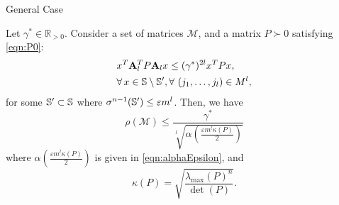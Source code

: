 \begin{subsection}{General Case}
\begin{thm}\label{thm:mainTheorem01}
Let $\gamma^* \in \mathbb{R}_{> 0}$. Consider a set of matrices $\mathcal{M}$, and a matrix $P \succ 0$ satisfying \eqref{eqn:P0}:
\begin{equation}\label{eq:assumptionThm01}
\begin{aligned}
&x^T \mathbf{A}_l^T P\mathbf{A}_l x\leq (\gamma^*)^{2l} x^T P x,\\
& \forall\, x \in \mathbb{S} \setminus \mathbb{S}', \forall\ (j_1, \dotsc, j_l) \in M^l,
\end{aligned}
\end{equation}
for some $\mathbb{S}' \subset \mathbb{S}$ where $\sigma^{n-1}(\mathbb{S}') \leq \varepsilon m^l$. Then, we have 
$$\rho(\mathcal{M}) \leq \frac{\gamma^{*}}{\sqrt[l]{\alpha \left( \frac{\varepsilon m^l \kappa(P)}{2} \right)}}$$
where $\alpha(\frac{\varepsilon m^l \kappa(P)}{2})$ is given in \eqref{eqn:alphaEpsilon}, and $$\kappa(P) = \sqrt{\frac{\lambda_{\max}(P)^n}{\det(P)}}.$$
\end{thm}

\begin{pf}


\end{pf}
\end{subsection}

